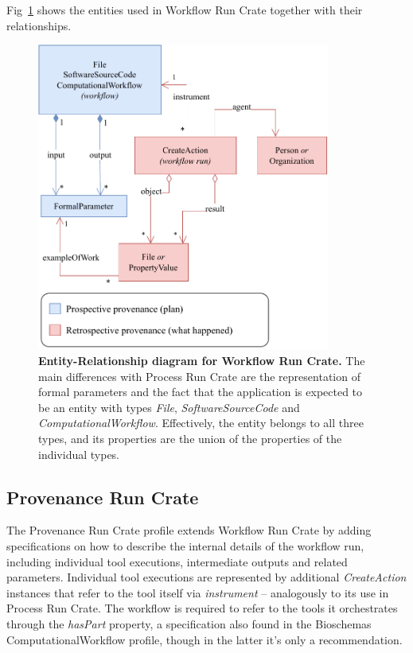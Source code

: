 \documentclass[10pt,letterpaper]{article}
\begin{document}
Fig~\ref{fig:workflow_crate_er} shows the entities used in Workflow Run Crate together with their relationships.

\begin{figure}[!h]
\includegraphics[width=26em]{wrroc-figure2.drawio.pdf}
\caption{{\bf Entity-Relationship diagram for Workflow Run Crate.}
The main differences with Process Run Crate are the representation of formal parameters and the fact that the application is expected to be an entity with types \emph{File}, \emph{SoftwareSourceCode} and \emph{ComputationalWorkflow}.
Effectively, the entity belongs to all three types, and its properties are the union of the properties of the individual types.
}
\label{fig:workflow_crate_er}
\end{figure}


\subsection{Provenance Run Crate}\label{provenance-run-crate}

The Provenance Run Crate profile extends Workflow Run Crate by adding specifications on how to describe the internal details of the workflow run, including individual tool executions, intermediate outputs and related parameters.
Individual tool executions are represented by additional \emph{CreateAction} instances that refer to the tool itself via \emph{instrument} -- analogously to its use in Process Run Crate.
The workflow is required to refer to the tools it orchestrates through the \emph{hasPart} property, a specification also found in the Bioschemas ComputationalWorkflow profile, though in the latter it's only a recommendation.
\end{document}
